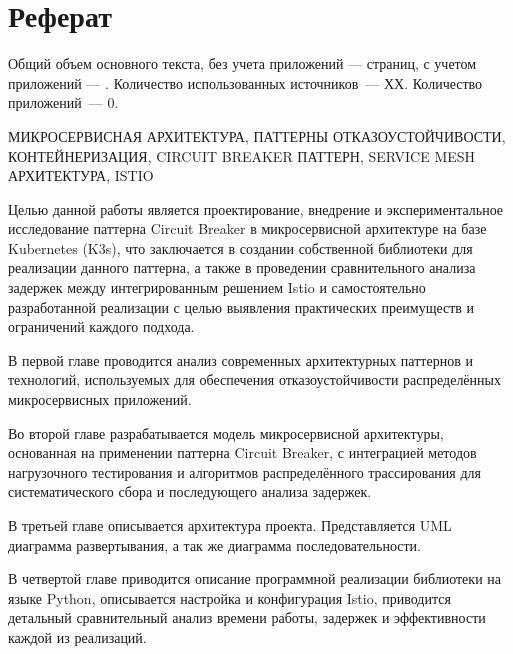 \chapter*{Реферат}
\thispagestyle{plain}

Общий объем основного текста, без учета приложений ---
\pageref{end_of_main_text} страниц, с учетом приложений ---
\pageref{end_of_document}. Количество использованных источников~--- ХХ.
Количество приложений~--- 0.

\noindent \uppercase{микросервисная архитектура, паттерны отказоустойчивости, контейнеризация, circuit breaker паттерн, service mesh архитектура, Istio}

Целью данной работы является проектирование, внедрение и экспериментальное исследование паттерна Circuit Breaker в микросервисной архитектуре на базе Kubernetes (K3s), что заключается в создании собственной библиотеки для реализации данного паттерна, а также в проведении сравнительного анализа задержек между интегрированным решением Istio и самостоятельно разработанной реализации с целью выявления практических преимуществ и ограничений каждого подхода.

В первой главе проводится анализ современных архитектурных паттернов и технологий, используемых для обеспечения отказоустойчивости распределённых микросервисных приложений.

Во второй главе разрабатывается модель микросервисной архитектуры, основанная на применении паттерна Circuit Breaker, с интеграцией методов нагрузочного тестирования и алгоритмов распределённого трассирования для систематического сбора и последующего анализа задержек.

В третьей главе описывается архитектура проекта. Представляется UML диаграмма развертывания, а так же диаграмма последовательности.

В четвертой главе приводится описание программной реализации библиотеки на языке Python, описывается настройка и конфигурация Istio, приводится детальный сравнительный анализ времени работы, задержек и эффективности каждой из реализаций.




